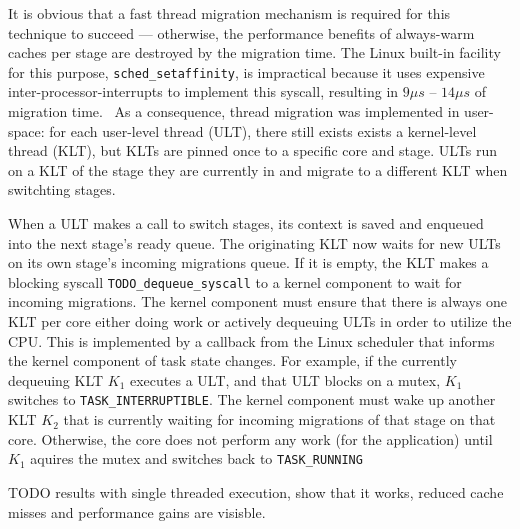 \documentclass[12pt,a4paper]{article}
\begin{document}
It is obvious that a fast thread migration mechanism is required for this technique to succeed
--- otherwise, the performance benefits of always-warm caches per stage are destroyed by the migration time.
The Linux built-in facility for this purpose, \texttt{sched\_setaffinity}, is impractical because it uses
expensive inter-processor-interrupts to implement this syscall, resulting in $9\mu s$ -- $14\mu s$ of migration time.~\cite{sodaspr}%
As a consequence, thread migration was implemented in user-space:
for each user-level thread (ULT), there still exists exists a kernel-level thread (KLT),
but KLTs are pinned once to a specific core and stage.
ULTs run on a KLT of the stage they are currently in and migrate to a different KLT when switchting stages.

When a ULT makes a call to switch stages, its context is saved and enqueued into the next stage's ready queue.
The originating KLT now waits for new ULTs on its own stage's incoming migrations queue.
If it is empty, the KLT makes a blocking syscall \texttt{TODO\_dequeue\_syscall} to a kernel component to wait for incoming migrations.
The kernel component must ensure that there is always one KLT per core either doing work or actively dequeuing ULTs in order to utilize the CPU.
This is implemented by a callback from the Linux scheduler that informs the kernel component of task state changes.
For example, if the currently dequeuing KLT $K_1$ executes a ULT, and that ULT blocks on a mutex, $K_1$ switches to \texttt{TASK\_INTERRUPTIBLE}.
The kernel component must wake up another KLT $K_2$ that is currently waiting for incoming migrations of that stage on that core.
Otherwise, the core does not perform any work (for the application) until $K_1$ aquires the mutex and switches back to \texttt{TASK\_RUNNING}

TODO results with single threaded execution, show that it works, reduced cache misses and performance gains are visisble.
\end{document}
